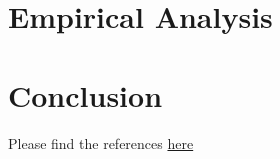 \documentclass[12pt,twoside]{report}
\newcommand{\mcite}[1]{\textcolor{mycolor}{\citeauthor{#1} (\citeyear{#1})}}
\newcommand{\hcite}[1]{(\textcolor{mycolor}{\citeauthor{#1}, \citeyear{#1}})}
\begin{document}
    \chapter{Empirical Analysis}
    
    
    \chapter{Conclusion}
    
    
    
    
    \vspace{2.0cm}
    Please find the references  \href{https://drive.google.com/open?id=1-OXUz-rUF5bd-c2KQm9c7V5TbOQva9tQitMAXQfyiiY}{here} 

    \appendix
    \chapter{}
    
    
    \chapter{}
    
    
    \chapter{}
    
\end{document}
